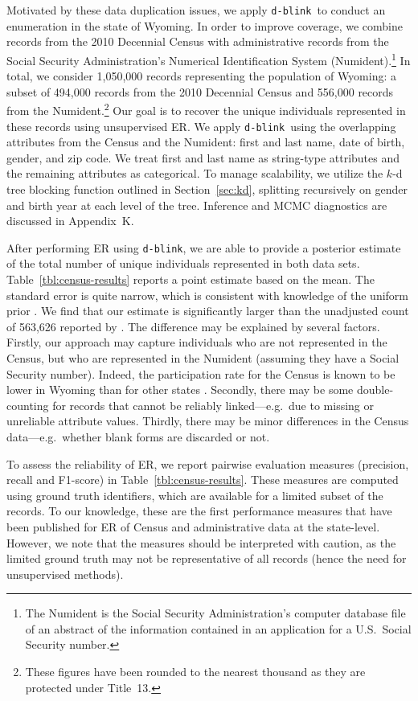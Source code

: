 \documentclass[12pt,letterpaper]{article}
\newcommand{\1}[1]{\mathbb{I}\!\left[#1\right]} %
\newcommand{\dblink}{\texttt{\upshape \lowercase{d-blink}}} %
\begin{document}
Motivated by these data duplication issues, we apply \dblink\ to conduct 
an enumeration in the state of Wyoming. 
In order to improve coverage, we combine records from the 
2010 Decennial Census with administrative records from the 
Social Security Administration's Numerical Identification System 
(Numident).\footnote{The Numident is the Social Security Administration's 
computer database file of an abstract of the information contained in an 
application for a U.S.\ Social Security number.} 
In total, we consider 1,050,000 records representing the population of 
Wyoming: 
a subset of 494,000 records from the 2010 Decennial Census and 556,000 
records from the Numident.\footnote{These figures 
have been rounded to the nearest thousand as they are protected under 
Title~13.}
Our goal is to recover the unique individuals represented in these records
using unsupervised ER.
We apply \dblink\ using the overlapping attributes from the Census and the 
Numident: first and last name, date of birth, gender, and zip code. 
We treat first and last name as string-type attributes and the remaining 
attributes as categorical. 
To manage scalability, we utilize the $k$-d tree blocking function outlined 
in Section~\ref{sec:kd}, splitting recursively on gender and birth year at 
each level of the tree. 
Inference and MCMC diagnostics are discussed in Appendix~K.

After performing ER using \dblink, we are able to provide a posterior 
estimate of the total number of unique individuals represented in both 
data sets. 
Table~\ref{tbl:census-results} reports a point estimate based on the mean. 
The standard error is quite narrow, which is consistent with 
knowledge of the uniform prior \citep{steorts_bayesian_2016}. 
We find that our estimate is significantly larger than the unadjusted count 
of 563,626 reported by \citet{census_report_2010}. 
The difference may be explained by several factors. 
Firstly, our approach may capture individuals who are not represented 
in the Census, but who are represented in the Numident (assuming they 
have a Social Security number).
Indeed, the participation rate for the Census is known to be lower in 
Wyoming than for other states \citep{census_response}.
Secondly, there may be some double-counting for records that cannot 
be reliably linked---e.g.~due to missing or unreliable attribute values.
Thirdly, there may be minor differences in the Census data---e.g.\ 
whether blank forms are discarded or not.

To assess the reliability of ER, we report pairwise evaluation measures 
(precision, recall and F1-score) in Table~\ref{tbl:census-results}. 
These measures are computed using ground truth identifiers, 
which are available for a limited subset of the records.
To our knowledge, these are the first performance measures that have been 
published for ER of Census and administrative data at the state-level.
However, we note that the measures should be interpreted with caution, 
as the limited ground truth may not be representative of all records 
(hence the need for unsupervised methods).
\end{document}
